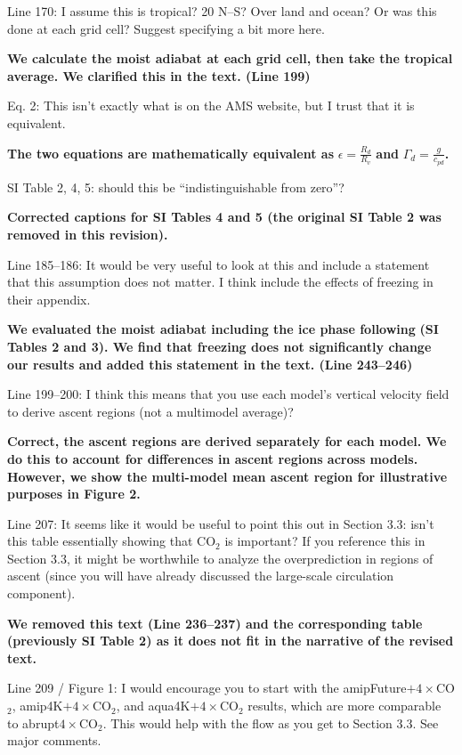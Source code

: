 \documentclass[11pt]{article}
\begin{document}
Line 170: I assume this is tropical? 20 N--S? Over land and ocean? Or was this done at each grid cell? Suggest specifying a bit more here.

\textbf{We calculate the moist adiabat at each grid cell, then take the tropical average. We clarified this in the text. (Line 199)}

Eq. 2: This isn't exactly what is on the AMS website, but I trust that it is equivalent.

\textbf{The two equations are mathematically equivalent as} \(\epsilon=\frac{R_d}{R_v}\) \textbf{and} \(\Gamma_d=\frac{g}{c_{pd}}\)\textbf{.}

SI Table 2, 4, 5: should this be ``indistinguishable from zero''?

\textbf{Corrected captions for SI Tables 4 and 5 (the original SI Table 2 was removed in this revision).}

Line 185--186: It would be very useful to look at this and include a statement that this assumption does not matter. I think \cite{flannaghan_tropical_2014} include the effects of freezing in their appendix.

\textbf{We evaluated the moist adiabat including the ice phase following} \cite{flannaghan_tropical_2014} \textbf{ (SI Tables 2 and 3). We find that freezing does not significantly change our results and added this statement in the text. (Line 243--246)}

Line 199--200: I think this means that you use each model's vertical velocity field to derive ascent regions (not a multimodel average)?

\textbf{Correct, the ascent regions are derived separately for each model. We do this to account for differences in ascent regions across models. However, we show the multi-model mean ascent region for illustrative purposes in Figure 2.}

Line 207: It seems like it would be useful to point this out in Section 3.3: isn't this table essentially showing that CO\(_2\) is important? If you reference this in Section 3.3, it might be worthwhile to analyze the overprediction in regions of ascent (since you will have already discussed the large-scale circulation component).

\textbf{We removed this text (Line 236--237) and the corresponding table (previously SI Table 2) as it does not fit in the narrative of the revised text.}

Line 209 / Figure 1: I would encourage you to start with the amipFuture\(+4\times\)CO\(_2\), amip4K\(+4\times\)CO\(_2\), and aqua4K\(+4\times\)CO\(_2\) results, which are more comparable to abrupt\(4\times\)CO\(_2\). This would help with the flow as you get to Section 3.3. See major comments.
\end{document}
